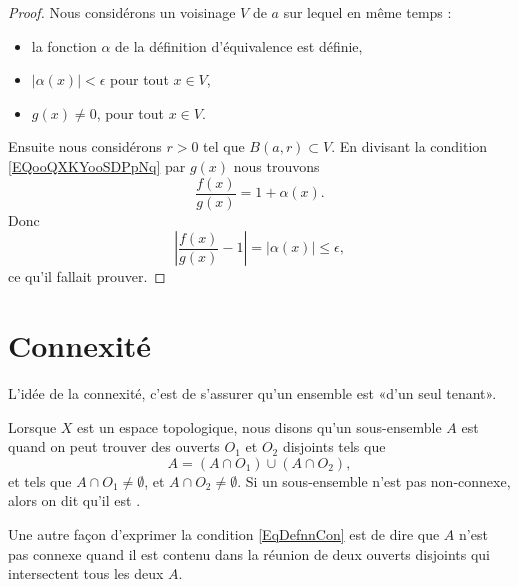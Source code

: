 \begin{proof}
	Nous considérons un voisinage \( V\) de \( a\) sur lequel en même temps :
	\begin{itemize}
		\item
		      la fonction \( \alpha\) de la définition d'équivalence est définie,
		\item
		      \( | \alpha(x) |<\epsilon\) pour tout \( x\in V\),
		\item
		      \( g(x)\neq 0\), pour tout \( x\in V\).
	\end{itemize}
	Ensuite nous considérons \( r>0\) tel que \( B(a,r)\subset V\). En divisant la condition \eqref{EQooQXKYooSDPpNq} par \( g(x)\) nous trouvons
	\begin{equation}
		\frac{ f(x) }{ g(x) }=1+\alpha(x).
	\end{equation}
	Donc
	\begin{equation}
		| \frac{ f(x) }{ g(x) }-1 |=| \alpha(x) |\leq \epsilon,
	\end{equation}
	ce qu'il fallait prouver.
\end{proof}


\section{Connexité}

L'idée de la connexité, c'est de s'assurer qu'un ensemble est «d'un seul tenant».

\begin{definition}  \label{DefIRKNooJJlmiD}
	Lorsque \( X\) est un espace topologique, nous disons qu'un sous-ensemble \( A\) est  quand on peut trouver des ouverts \( O_1\) et \( O_2\) disjoints tels que
	\begin{equation}    \label{EqDefnnCon}
		A=(A\cap O_1)\cup (A\cap O_2),
	\end{equation}
	et tels que \( A\cap O_1\neq\emptyset\), et \( A\cap O_2\neq\emptyset\). Si un sous-ensemble n'est pas non-connexe, alors on dit qu'il est .
\end{definition}
Une autre façon d'exprimer la condition \eqref{EqDefnnCon} est de dire que \( A\) n'est pas connexe quand il est contenu dans la réunion de deux ouverts disjoints qui intersectent tous les deux \( A\).


